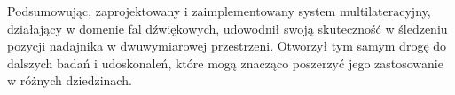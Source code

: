 Podsumowując, zaprojektowany i zaimplementowany system multilateracyjny, działający w domenie fal dźwiękowych, udowodnił swoją skuteczność w śledzeniu pozycji nadajnika w dwuwymiarowej przestrzeni. Otworzył tym samym drogę do dalszych badań i udoskonaleń, które mogą znacząco poszerzyć jego zastosowanie w różnych dziedzinach.
